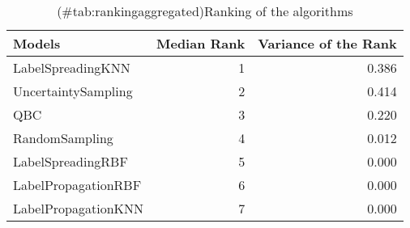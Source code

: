 \begin{table}[!h]

\caption{(\#tab:rankingaggregated)Ranking of the algorithms}
\centering
\begin{tabular}[t]{lrr}
\toprule
Models & Median Rank & Variance of the Rank\\
\midrule
LabelSpreadingKNN & 1 & 0.386\\
UncertaintySampling & 2 & 0.414\\
QBC & 3 & 0.220\\
RandomSampling & 4 & 0.012\\
LabelSpreadingRBF & 5 & 0.000\\
LabelPropagationRBF & 6 & 0.000\\
LabelPropagationKNN & 7 & 0.000\\
\bottomrule
\end{tabular}
\end{table}
